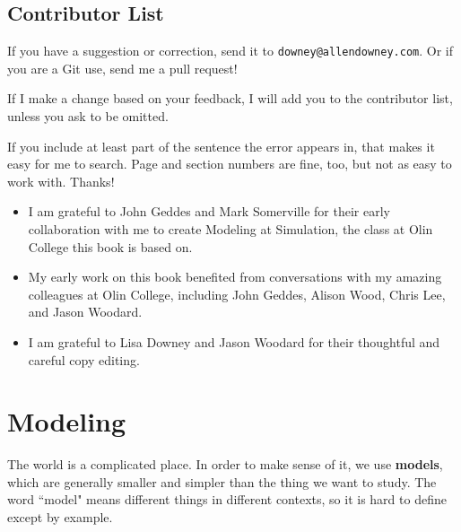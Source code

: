 \documentclass[12pt]{book}
\theoremstyle{exercise}
\begin{document}
\section*{Contributor List}

If you have a suggestion or correction, send it to 
{\tt downey@allendowney.com}.  Or if you are a Git use, send me a pull request!

If I make a change based on your feedback, I will add you to the contributor list, unless you ask to be omitted.

If you include at least part of the sentence the error appears in, that makes it easy for me to search.  Page and section numbers are fine, too, but not as easy to work with.  Thanks!

\begin{itemize}

\item I am grateful to John Geddes and Mark Somerville for their early collaboration with me to create Modeling at Simulation, the class at Olin College this book is based on.

\item My early work on this book benefited from conversations with
my amazing colleagues at Olin College, including John Geddes, Alison
Wood, Chris Lee, and Jason Woodard.

\item I am grateful to Lisa Downey and Jason Woodard for their thoughtful and careful copy editing.




\end{itemize}



\normalsize

\cleardoublepage

\begin{latexonly}


\cleardoublepage

\end{latexonly}

\mainmatter


\chapter{Modeling}
\label{chap01}

The world is a complicated place.  In order to make sense of it, we use {\bf models}, which are generally smaller and simpler than the thing we want to study.  The word ``model" means different things in different contexts, so it is hard to define except by example.
\end{document}
